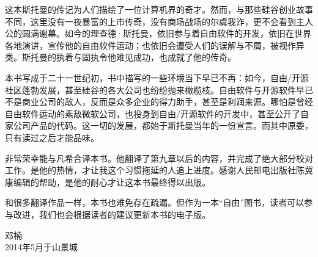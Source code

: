 这本斯托曼的传记为人们描绘了一位计算机界的奇才。然而，与那些硅谷创业故事不同，这里没有一夜暴富的上市传奇，没有商场战场的尔虞我诈，更不会看到主人公的圆满谢幕。如今的理查德·斯托曼，依旧参与着自由软件的开发，依旧在世界各地演讲，宣传他的自由软件运动；也依旧会遭受人们的误解与不屑，被视作异类。斯托曼的执着与固执令他难见成功，也成就了他的传奇。

本书写成于二十一世纪初，书中描写的一些环境当下早已不再：如今，自由/开源社区蓬勃发展，甚至硅谷的各大公司也纷纷抛来橄榄枝。自由软件与开源软件早已不是商业公司的敌人，反而是众多企业的得力助手，甚至是利润来源。哪怕是曾经自由软件运动的素敌微软公司，也投身到自由/开源软件的开发中，甚至公开了自家公司产品的代码。这一切的发展，都始于斯托曼当年的一份宣言。而其中原委，只有读过之后才能品味。

非常荣幸能与凡希合译本书。他翻译了第九章以后的内容，并完成了绝大部分校对工作。是他的热情，才让我这个习惯拖延的人追上进度。感谢人民邮电出版社陈冀康编辑的帮助，是他的耐心才让这本书最终得以出版。

和很多翻译作品一样，本书也难免存在疏漏。但作为一本``自由''图书，读者可以参与改进，我们也会根据读者的建议更新本书的电子版。

邓楠\\
2014年5月于山景城




